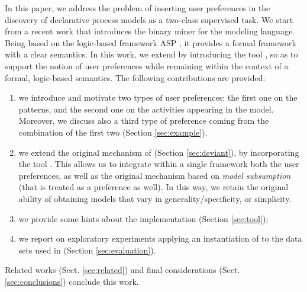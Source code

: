 In this paper, we address the problem of inserting user preferences in the discovery of declarative process models as a two-class supervised task. We start from a recent work \cite{deviant-tkde} that introduces the \nd binary miner for the \declare \cite{2009-Aalst} modeling language. Being \nd based on the logic-based framework ASP \cite{asp-intro}, it provides a formal framework with a clear semantics. In this work, we extend \nd by introducing the \asprin tool \cite{DBLP:conf/aaai/BrewkaD0S15}, so as to support the notion of user preferences while remaining within the context of a formal, logic-based semantics. The following contributions are provided:
%
\begin{enumerate}[{(i)}]
    \item we introduce and motivate two types of user preferences: the first one on the \declare patterns, and the second one on the activities appearing in the model. Moreover, we discuss also a third type of preference coming from the combination of the first two (Section \ref{sec:example}).
	\item we extend the original mechanism of \nd (Section \ref{sec:deviant}), by incorporating the \asprin tool \cite{DBLP:conf/aaai/BrewkaD0S15}. This allows us to integrate within a single framework both the user preferences, as well as the original \nd mechanism based on \emph{model subsumption} (that is treated as a preference as well). In this way, we retain the original ability of obtaining models that vary in generality/specificity, or simplicity.
	\item we provide some hints about the implementation (Section \ref{sec:tool});   
	\item we report on exploratory experiments applying an instantiation of \nd  to the data sets used in \cite{2007b-Lamma,DBLP:conf/bpm/SlaatsDB21} (Section \ref{sec:evaluation}).
\end{enumerate}
Related works (Sect. \ref{sec:related}) and final considerations (Sect. \ref{sec:conclusions}) conclude this work.

